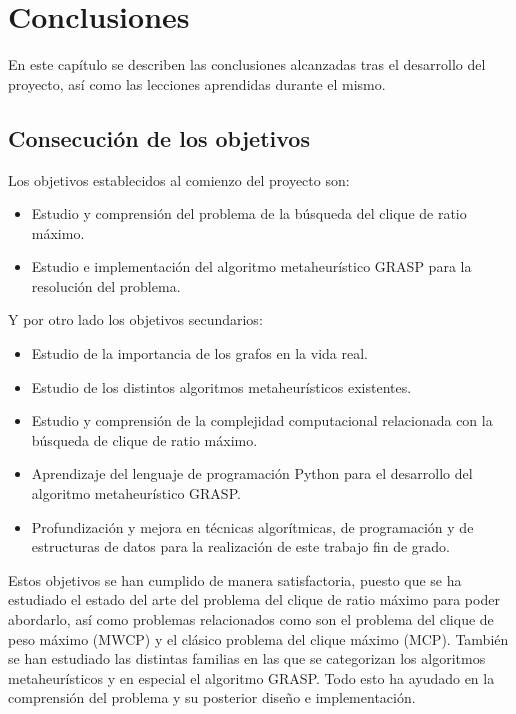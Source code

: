 
\chapter{Conclusiones} %

\label{Chapter6} %


En este capítulo se describen las conclusiones alcanzadas tras el desarrollo del proyecto, así como las lecciones aprendidas durante el mismo.

\section{Consecución de los objetivos}

Los objetivos establecidos al comienzo del proyecto son:

\begin{itemize}
	\item Estudio y comprensión del problema de la búsqueda del clique de ratio máximo.
	\item Estudio e implementación del algoritmo metaheurístico \gls{GRASP} para la resolución del problema.
\end{itemize}

Y por otro lado los objetivos secundarios:
\begin{itemize}
	\item Estudio de la importancia de los grafos en la vida real.
	\item Estudio de los distintos algoritmos metaheurísticos existentes.
	\item Estudio y comprensión de la complejidad computacional relacionada con la búsqueda de clique de ratio máximo.
	\item Aprendizaje del lenguaje de programación Python para el desarrollo del algoritmo metaheurístico \gls{GRASP}.
	\item Profundización y mejora en técnicas algorítmicas, de programación y de estructuras de datos para la realización de este trabajo fin de grado.
\end{itemize}

Estos objetivos se han cumplido de manera satisfactoria, puesto que se ha estudiado el estado del arte del problema del clique de ratio máximo para poder abordarlo, así como problemas relacionados como son el problema del clique de peso máximo (\gls{MWCP}) y el clásico problema del clique máximo (\gls{MCP}).
También se han estudiado las distintas familias en las que se categorizan los algoritmos metaheurísticos y en especial el algoritmo \gls{GRASP}.
Todo esto ha ayudado en la comprensión del problema y su posterior diseño e implementación.

